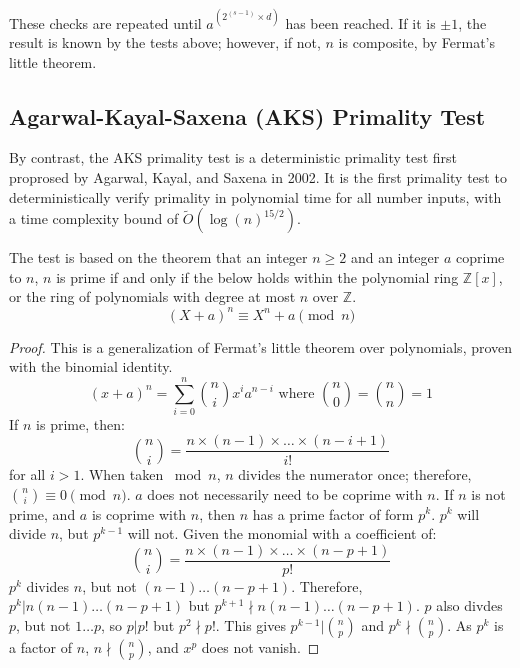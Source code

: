 \documentclass{article}
\begin{document}
These checks are repeated until $a^{(2^{(s - 1)} \times d)}$ has been reached. If it is $\pm 1$, the result is known by the tests above; however, if not, $n$ is composite, by Fermat's little theorem.

\subsection{Agarwal-Kayal-Saxena (AKS) Primality Test}
\label{theory:aks}
By contrast, the AKS primality test is a deterministic primality test first proprosed by Agarwal, Kayal, and Saxena in 2002. It is the first primality test to deterministically verify primality in polynomial time for all number inputs, with a time complexity bound of $\widetilde{O}(\log{(n)}^{15/2})$.

The test is based on the theorem that an integer $n \geq 2$ and an integer $a$ coprime to $n$, $n$ is prime if and only if the below holds within the polynomial ring $\mathbb{Z}[x]$, or the ring of polynomials with degree at most $n$ over $\mathbb{Z}$.
\[
    (X + a)^n \equiv X^n + a \pmod{n}
\]

\begin{proof} %
    This is a generalization of Fermat's little theorem over polynomials, proven with the binomial identity.
    \[
        (x + a)^n = \sum_{i=0}^{n} \binom{n}{i} x^i a^{n - i} \text{ where } \binom{n}{0} = \binom{n}{n} = 1
    \]
    If $n$ is prime, then:
    \[
        \binom{n}{i} = \frac{n \times (n - 1) \times \ldots{} \times (n - i + 1)}{i!}
    \]
    for all $i > 1$. When taken $\bmod{n}$, $n$ divides the numerator once; therefore, $\binom{n}{i} \equiv 0 \pmod{n}$. $a$ does not necessarily need to be coprime with $n$.
    If $n$ is not prime, and $a$ is coprime with $n$, then $n$ has a prime factor of form $p^k$. $p^k$ will divide $n$, but $p^{k - 1}$ will not. Given the monomial with a coefficient of:
    \[
        \binom{n}{i} = \frac{n \times (n - 1) \times \ldots{} \times (n - p + 1)}{p!}
    \]
    $p^k$ divides $n$, but not $(n - 1) \ldots{} (n - p + 1)$. Therefore, $p^k \vert n (n - 1) \ldots{} (n - p + 1)$ but $p^{k + 1} \nmid n (n - 1) \ldots{} (n - p + 1)$. $p$ also divdes $p$, but not $1 \ldots p$, so $p \vert p!$ but $p^2 \nmid p!$. This gives $p^{k - 1} \vert \binom{n}{p}$ and $p^k \nmid \binom{n}{p}$. As $p^k$ is a factor of $n$, $n \nmid \binom{n}{p}$, and $x^p$ does not vanish.
\end{proof}
\end{document}
